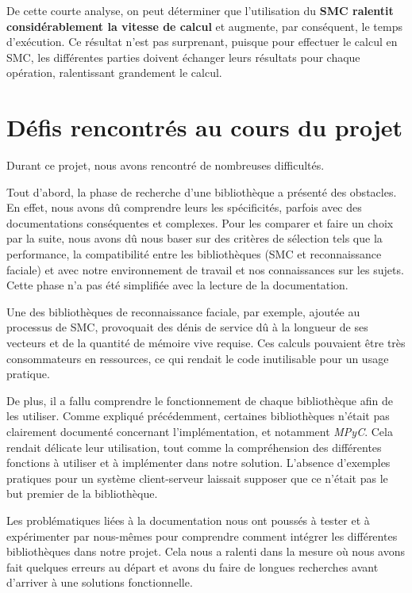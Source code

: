 \documentclass[12pt,a4paper]{article}
\begin{document}
De cette courte analyse, on peut déterminer que l'utilisation du \textbf{SMC ralentit considérablement la vitesse de calcul} et augmente, par conséquent, le temps d'exécution. Ce résultat n'est pas surprenant, puisque pour effectuer le calcul en SMC, les différentes parties doivent échanger leurs résultats pour chaque opération, ralentissant grandement le calcul.

\section{Défis rencontrés au cours du projet}
Durant ce projet, nous avons rencontré de nombreuses difficultés.

Tout d’abord, la phase de recherche d’une bibliothèque a présenté des obstacles. En effet, nous avons dû comprendre leurs les spécificités, parfois avec des documentations conséquentes et complexes. Pour les comparer et faire un choix par la suite, nous avons dû nous baser sur des critères de sélection tels que la performance, la compatibilité entre les bibliothèques (SMC et reconnaissance faciale) et avec notre environnement de travail et nos connaissances sur les sujets. Cette phase n'a pas été simplifiée avec la lecture de la documentation.

Une des bibliothèques de reconnaissance faciale, par exemple, ajoutée au processus de SMC, provoquait des dénis de service dû à la longueur de ses vecteurs et de la quantité de mémoire vive requise. Ces calculs pouvaient être très consommateurs en ressources, ce qui rendait le code inutilisable pour un usage pratique.

De plus, il a fallu comprendre le fonctionnement de chaque bibliothèque afin de les utiliser. Comme expliqué précédemment, certaines bibliothèques n'était pas clairement documenté concernant l'implémentation, et notamment \textit{MPyC}. Cela rendait délicate leur utilisation, tout comme la compréhension des différentes fonctions à utiliser et à implémenter dans notre solution. L'absence d'exemples pratiques pour un système client-serveur laissait supposer que ce n'était pas le but premier de la bibliothèque.

Les problématiques liées à la documentation nous ont poussés à tester et à expérimenter par nous-mêmes pour comprendre comment intégrer les différentes bibliothèques dans notre projet. Cela nous a ralenti dans la mesure où nous avons fait quelques erreurs au départ et avons du faire de longues recherches avant d'arriver à une solutions fonctionnelle.
\end{document}
